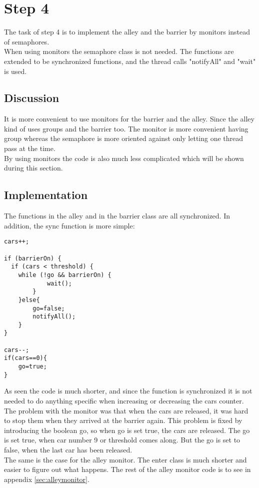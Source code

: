 \section{Step 4}
The task of step 4 is to implement the alley and the barrier by monitors instead of semaphores. \\
When using monitors the semaphore class is not needed. The functions are extended to be synchronized functions, and the thread calls "notifyAll" and "wait" is used.

\subsection{Discussion}
It is more convenient to use monitors for the barrier and the alley. Since the alley kind of uses groups and the barrier too. The monitor is more convenient having group whereas the semaphore is more oriented against only letting one thread pass at the time. \\
By using monitors the code is also much less complicated which will be shown during this section.

\subsection{Implementation}
The functions in the alley and in the barrier class are all synchronized. In addition, the sync function is more simple: 

\begin{lstlisting}
cars++;

if (barrierOn) {
  if (cars < threshold) {
    while (!go && barrierOn) {
			wait();	
		}
	}else{
		go=false;
		notifyAll();
	}
} 

cars--;
if(cars==0){
	go=true;
}
\end{lstlisting}
\vspace{.8cm}

As seen the code is much shorter, and since the function is synchronized it is not needed to do anything specific when increasing or decreasing the cars counter. The problem with the monitor was that when the cars are released, it was hard to stop them when they arrived at the barrier again. This problem is fixed by introducing the boolean go, so when go is set true, the cars are released. The go is set true, when car number 9 or threshold comes along. But the go is set to false, when 
the last car has been released. 
\\

The same is the case for the alley monitor. The enter class is much shorter and easier to figure out what happens. The rest of the alley monitor code is to see in appendix \ref{sec:alleymonitor}. 